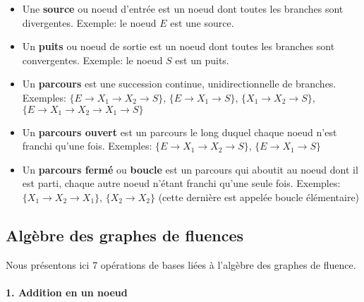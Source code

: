 \begin{itemize}
    \item Une \textbf{source} ou noeud d'entrée est un noeud dont 
          toutes les branches sont divergentes. Exemple: le noeud 
          $E$ est une source.
    \item Un \textbf{puits} ou noeud de sortie est un noeud dont toutes 
    les branches sont convergentes. Exemple: le noeud $S$ est un puits.
    \item Un \textbf{parcours} est une succession continue, 
    unidirectionnelle de branches. Exemples: 
    $\{E\rightarrow X_1\rightarrow X_2\rightarrow S\}$, 
    $\{E\rightarrow X_1\rightarrow S\}$, 
    $\{X_1\rightarrow X_2\rightarrow S\}$, 
    $\{E\rightarrow X_1\rightarrow X_2\rightarrow X_1\rightarrow S\}$

    \item Un \textbf{parcours ouvert} est un parcours le long duquel chaque 
          noeud n'est franchi qu'une fois. Exemples: 
          $\{E\rightarrow X_1\rightarrow X_2\rightarrow S\}$, 
          $\{E\rightarrow X_1 \rightarrow S\}$
    \item Un \textbf{parcours fermé} ou \textbf{boucle} est un parcours qui 
          aboutit au noeud dont il est parti, chaque autre noeud n'étant 
          franchi qu'une seule fois. Exemples: 
          $\{X_1\rightarrow X_2\rightarrow X_1\}$, 
          $\{X_2\rightarrow X_2\}$ (cette dernière est appelée boucle 
          élémentaire)
\end{itemize}

\subsection{Algèbre des graphes de fluences}
Nous présentons ici 7 opérations de bases liées à l'algèbre des 
graphes de fluence.

\paragraph{1. Addition en un noeud}

